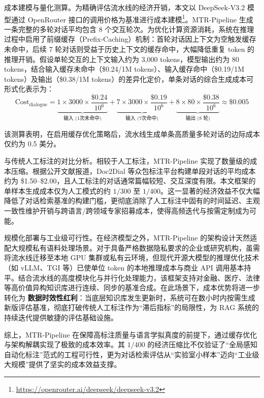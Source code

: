 成本建模与量化测算。为精确评估流水线的经济开销，本文以 DeepSeek-V3.2 模型通过 OpenRouter 接口的调用价格为基准进行成本建模\footnote{\url{https://openrouter.ai/deepseek/deepseek-v3.2}}。MTR-Pipeline 生成一条完整的多轮对话平均包含 8 个交互轮次。为优化计算资源消耗，系统在推理过程中启用了前缀缓存（Prefix-Caching）机制：首轮对话因上下文为空触发缓存未命中，后续 7 轮对话则受益于历史上下文的缓存命中，大幅降低重复 token 的推理开销。假设单轮交互的上下文输入约为 3,000 tokens，模型输出约为 80 tokens，结合输入缓存未命中（\$0.24/1M tokens）、输入缓存命中（\$0.19/1M tokens）及输出（\$0.38/1M tokens）的差异化定价，单条对话的综合生成成本可形式化表示为：
\begin{equation}
    \text{Cost}_{\text{dialogue}} = \underbrace{1 \times 3000 \times \frac{\$0.24}{10^6}}_{\text{输入 (1次未命中)}} + \underbrace{7 \times 3000 \times \frac{\$0.19}{10^6}}_{\text{输入 (7次命中)}} + \underbrace{8 \times 80 \times \frac{\$0.38}{10^6}}_{\text{输出 (8 轮)}} \approx \$0.005
\end{equation}

该测算表明，在启用缓存优化策略后，流水线生成单条高质量多轮对话的边际成本仅约为 0.5 美分。



与传统人工标注的对比分析。相较于人工标注，MTR-Pipeline 实现了数量级的成本压缩。根据公开文献报道，Doc2Dial 等众包标注平台构建单段对话的平均成本约为 \$1.50--\$2.00，且人工标注的对话通常篇幅较短、交互深度有限。本文框架的单样本生成成本仅为人工模式的约 $1/300$ 至 $1/400$。这一显著的经济效益不仅大幅降低了对话检索基准的构建门槛，更彻底消除了人工标注中固有的时间延迟、主观一致性维护开销与跨语言/跨领域专家招募成本，使得高频迭代与按需定制成为可能。



规模化部署与工业级可行性。在经济模型之外，MTR-Pipeline 的架构设计天然适配大规模私有语料处理场景。对于具备严格数据隐私要求的企业或研究机构，虽需将流水线迁移至本地 GPU 集群或私有云环境，但现代开源大模型的推理优化技术（如 vLLM、TGI 等）已使单位 token 的本地推理成本与商业 API 调用基本持平。结合流水线的高度模块化与并行化处理能力，该框架支持对金融、医疗、法律等高价值异构知识库进行连续、同步的基准合成。在此场景下，成本优势将进一步转化为 \textbf{数据时效性红利}：当底层知识库发生更新时，系统可在数小时内按需生成新版评估基准，彻底打破传统人工标注作为“滞后指标”的局限性，为 RAG 系统的持续迭代提供敏捷的评估基础设施。



综上，MTR-Pipeline 在保障高标注质量与语言学拟真度的前提下，通过缓存优化与架构解耦实现了极致的成本效率。其 $1/400$ 的经济压缩比不仅验证了“全局感知自动化标注”范式的工程可行性，更为对话检索评估从“实验室小样本”迈向“工业级大规模”提供了坚实的成本效益支撑。



